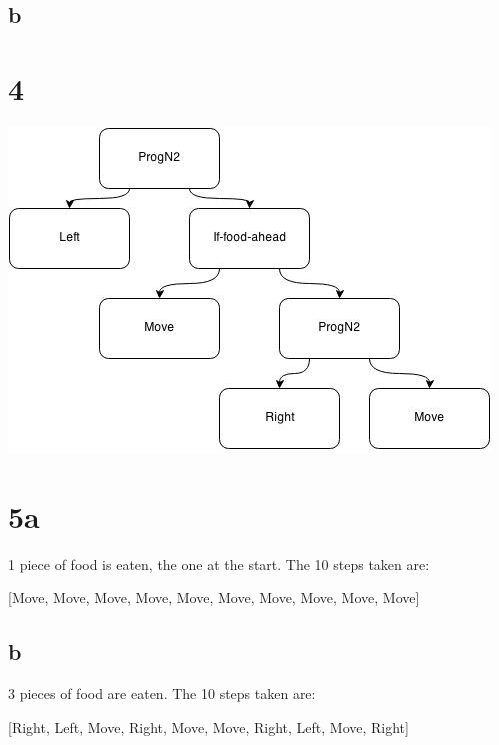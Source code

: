 \documentclass[12pt]{article}
\begin{document}
\subsection{b}

\section{4}
\includegraphics{problem4}

\section{5a}
1 piece of food is eaten, the one at the start.  The 10 steps taken are:
\begin{center}
[Move, Move, Move, Move, Move, Move, Move, Move, Move, Move]
\end{center}

\subsection{b}
3 pieces of food are eaten.  The 10 steps taken are:
\begin{center}
[Right, Left, Move, Right, Move, Move, Right, Left, Move, Right]
\end{center}
\end{document}
